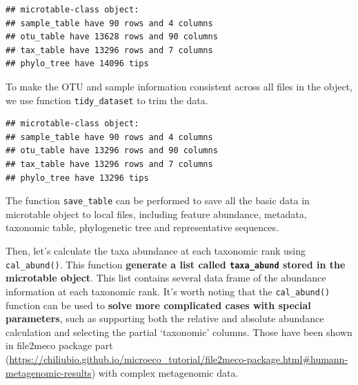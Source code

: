 \documentclass[
]{book}
\newenvironment{Shaded}{\begin{snugshade}}{\end{snugshade}}
\newcommand{\AttributeTok}[1]{\textcolor[rgb]{0.13,0.29,0.53}{#1}}
\newcommand{\FunctionTok}[1]{\textcolor[rgb]{0.13,0.29,0.53}{\textbf{#1}}}
\newcommand{\NormalTok}[1]{#1}
\newcommand{\SpecialCharTok}[1]{\textcolor[rgb]{0.81,0.36,0.00}{\textbf{#1}}}
\newcommand{\StringTok}[1]{\textcolor[rgb]{0.31,0.60,0.02}{#1}}
\begin{document}
\begin{verbatim}
## microtable-class object:
## sample_table have 90 rows and 4 columns
## otu_table have 13628 rows and 90 columns
## tax_table have 13296 rows and 7 columns
## phylo_tree have 14096 tips
\end{verbatim}

To make the OTU and sample information consistent across all files in the object, we use function \texttt{tidy\_dataset} to trim the data.

\begin{Shaded}
\end{Shaded}

\begin{verbatim}
## microtable-class object:
## sample_table have 90 rows and 4 columns
## otu_table have 13296 rows and 90 columns
## tax_table have 13296 rows and 7 columns
## phylo_tree have 13296 tips
\end{verbatim}

The function \texttt{save\_table} can be performed to save all the basic data in microtable object to local files,
including feature abundance, metadata, taxonomic table, phylogenetic tree and representative sequences.

\begin{Shaded}
\end{Shaded}

Then, let's calculate the taxa abundance at each taxonomic rank using \texttt{cal\_abund()}.
This function \textbf{generate a list called \texttt{taxa\_abund} stored in the microtable object}.
This list contains several data frame of the abundance information at each taxonomic rank.
It's worth noting that the \texttt{cal\_abund()} function can be used to \textbf{solve more complicated cases with special parameters},
such as supporting both the relative and absolute abundance calculation and selecting the partial `taxonomic' columns.
Those have been shown in file2meco package part (\url{https://chiliubio.github.io/microeco_tutorial/file2meco-package.html\#humann-metagenomic-results}) with complex metagenomic data.
\end{document}
